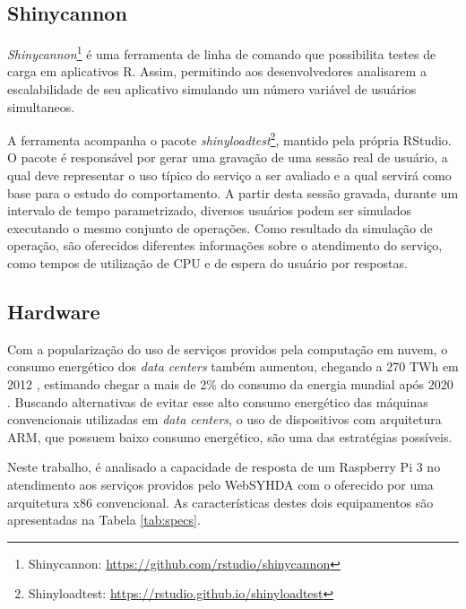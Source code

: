 \documentclass[12pt,english,brazil]{article}
\begin{document}
\subsection{Shinycannon} \label{sec:Shinycannon}

\textit{Shinycannon}\footnote{Shinycannon: \url{https://github.com/rstudio/shinycannon}} é uma ferramenta de linha de comando que possibilita testes de carga em aplicativos R. Assim, permitindo aos desenvolvedores analisarem a escalabilidade de seu aplicativo simulando um número variável de usuários simultaneos.

A ferramenta acompanha o pacote \textit{shinyloadtest}\footnote{Shinyloadtest: \url{https://rstudio.github.io/shinyloadtest}}, mantido pela própria RStudio. O pacote é responsável por gerar uma gravação de uma sessão real de usuário, a qual deve representar o uso típico do serviço a ser avaliado \cite{shinyloadtest} e a qual servirá como base para o estudo do comportamento. A partir desta sessão gravada, durante um intervalo de tempo parametrizado, diversos usuários podem ser simulados executando o mesmo conjunto de operações. Como resultado da simulação de operação, são oferecidos diferentes informações sobre o atendimento do serviço, como tempos de utilização de CPU e de espera do usuário por respostas.

\subsection{Hardware}\label{sec:Hardware}
Com a popularização do uso de serviços providos pela computação em nuvem, o consumo energético dos \emph{data centers} também aumentou, chegando a 270 TWh em 2012 \cite{VanHeddeghem:2014:TWI:2657027.2657141}, estimando chegar a mais de 2\% do consumo da energia mundial após 2020 \cite{energy}. Buscando alternativas de evitar esse alto consumo energético das máquinas convencionais utilizadas em \emph{data centers}, o uso de dispositivos com arquitetura ARM, que possuem baixo consumo energético, são uma das estratégias possíveis.

Neste trabalho, é analisado a capacidade de resposta de um Raspberry Pi 3 no atendimento aos serviços providos pelo WebSYHDA com o oferecido por uma arquitetura x86 convencional. As características destes dois equipamentos são apresentadas na Tabela \ref{tab:specs}. 
\end{document}

